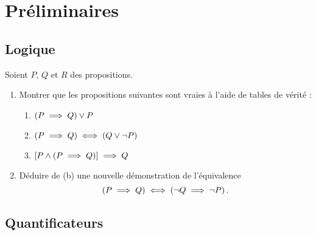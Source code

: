 \chapter{Préliminaires}

\minitoc

\section{Logique}

\begin{exo}
Soient \(P\), \(Q\) et \(R\) des propositions.

\begin{enumerate}
\item Montrer que les propositions suivantes sont vraies à l'aide de tables de vérité :

\begin{enumerate}
\item \(\left(P\implies Q\right)\lor P\) \\

\item \(\left(P\implies Q\right)\iff\left(Q\lor\lnot P\right)\) \\

\item \(\left[P\land\left(P\implies Q\right)\right]\implies Q\) \\
\end{enumerate}

\item Déduire de (b) une nouvelle démonstration de l'équivalence \[\left(P\implies Q\right)\iff\left(\lnot Q\implies\lnot P\right).\]
\end{enumerate}
\end{exo}

\begin{corr}
\end{corr}

\section{Quantificateurs}

